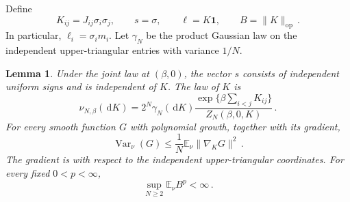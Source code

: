 \documentclass[11pt]{amsart}
\numberwithin{equation}{section}
\newtheorem{lemma}[theorem]{Lemma}
\theoremstyle{remark}
\newcommand{\E}{\mathbb E}
\newcommand{\one}{\mathbf 1}
\newcommand{\Var}{\operatorname{Var}}
\newcommand{\op}{\mathrm{op}}
\newcommand{\dd}{\,\mathrm d}
\begin{document}
Define
\begin{equation}
 K_{ij}=J_{ij}\sigma_i\sigma_j,\qquad
 s=\sigma,\qquad \ell=K\one,\qquad B=\|K\|_\op\,.
 \label{eq:gauge-variables}
\end{equation}
In particular, $\ell_i=\sigma_i m_i$. Let $\gamma_N$ be the product Gaussian law on the independent upper-triangular entries with variance $1/N$.

\begin{lemma}\label{lem:gauge}
Under the joint law at $(\beta,0)$, the vector $s$ consists of independent uniform signs and is independent of $K$. The law of $K$ is
\begin{equation}
 \nu_{N,\beta}(\dd K)
 =2^N\gamma_N(\dd K)
 \frac{\exp\{\beta\sum_{i<j}K_{ij}\}}{Z_N(\beta,0,K)}\,.
 \label{eq:gauge-law}
\end{equation}
For every smooth function $G$ with polynomial growth, together with its gradient,
\begin{equation}
 \Var_\nu(G)\le\frac1N\E_\nu\|\nabla_KG\|^2\,.
 \label{eq:gauge-poincare}
\end{equation}
The gradient is with respect to the independent upper-triangular coordinates. For every fixed $0<p<\infty$,
\begin{equation}
 \sup_{N\ge2}\E_\nu B^p<\infty\,.
 \label{eq:operator-moments}
\end{equation}
\end{lemma}
\end{document}
